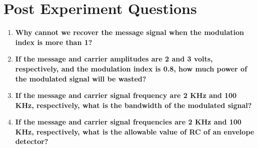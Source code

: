 \section*{Post Experiment Questions}

\begin{enumerate}
    \item \textbf{Why cannot we recover the message signal when the modulation index is more than 1?}\\
    \item \textbf{If the message and carrier amplitudes are 2 and 3 volts, respectively, and the modulation index is 0.8, how much power of the modulated signal will be wasted?}\\
    \item \textbf{If the message and carrier signal frequency are 2 KHz and 100 KHz, respectively, what is the bandwidth of the modulated signal?}\\
    \item \textbf{If the message and carrier signal frequencies are 2 KHz and 100 KHz, respectively, what is the allowable value of RC of an envelope detector?}\\
\end{enumerate}
